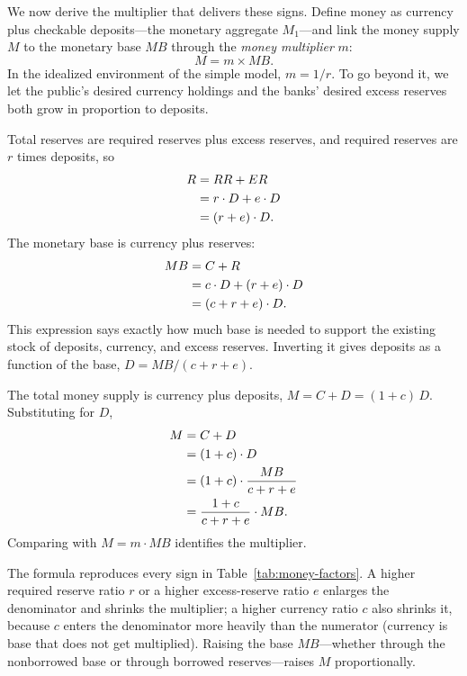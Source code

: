 We now derive the multiplier that delivers these signs. Define money as currency plus checkable deposits---the monetary aggregate $M_1$---and link the money supply $M$ to the monetary base $MB$ through the \emph{money multiplier} $m$:
\[
M = m \times MB.
\]
In the idealized environment of the simple model, $m = 1/r$. To go beyond it, we let the public's desired currency holdings and the banks' desired excess reserves both grow in proportion to deposits.


Total reserves are required reserves plus excess reserves, and required reserves are $r$ times deposits, so
\[
\begin{aligned}
R &= RR + ER \\
  &= r\cdot D + e\cdot D \\
  &= (r + e)\cdot D.
\end{aligned}
\]
The monetary base is currency plus reserves:
\[
\begin{aligned}
MB &= C + R \\
   &= c\cdot D + (r+e)\cdot D \\
   &= (c + r + e)\cdot D.
\end{aligned}
\]
This expression says exactly how much base is needed to support the existing stock of deposits, currency, and excess reserves. Inverting it gives deposits as a function of the base, $D = MB / (c+r+e)$.

The total money supply is currency plus deposits, $M = C + D = (1+c)\,D$. Substituting for $D$,
\[
\begin{aligned}
M &= C + D \\
  &= (1+c)\cdot D \\
  &= (1+c)\cdot \frac{MB}{c+r+e} \\
  &= \frac{1+c}{c+r+e}\cdot MB.
\end{aligned}
\]
Comparing with $M = m\cdot MB$ identifies the multiplier.


The formula reproduces every sign in Table~\ref{tab:money-factors}. A higher required reserve ratio $r$ or a higher excess-reserve ratio $e$ enlarges the denominator and shrinks the multiplier; a higher currency ratio $c$ also shrinks it, because $c$ enters the denominator more heavily than the numerator (currency is base that does not get multiplied). Raising the base $MB$---whether through the nonborrowed base or through borrowed reserves---raises $M$ proportionally.

